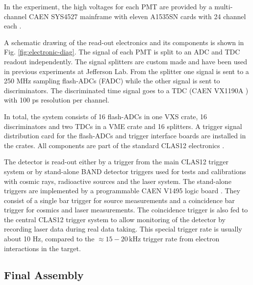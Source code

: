 \documentclass[3p,final,twocolumn]{elsarticle}
\begin{document}
In the experiment, the high voltages for each PMT are provided by a multi-channel CAEN SYS4527 mainframe with eleven A1535SN cards with 24 channel each \cite{caen-hvframe,caen-hvcard}.

A schematic drawing of the read-out electronics and its components is
shown in Fig. \ref{fig:electronic-diag}. The signal of each PMT is
split to an ADC and TDC readout independently.  The signal splitters
are custom made and have been used in previous experiments at
Jefferson Lab.  From the splitter one signal is sent to a 250
\si{\mega\hertz} sampling flash-ADCs \cite{fadc-manual} (FADC) while the
other signal is sent to discriminators.  The discriminated time signal
goes to a TDC (CAEN VX1190A \cite{caen-tdc}) with 100 ps resolution
per channel.


In total, the system consists of 16 flash-ADCs in one VXS crate, 16
discriminators and two TDCs in a VME crate and 16 splitters.
A trigger signal distribution card for the flash-ADCs and
trigger interface boards are installed in the crates. All components
are part of the standard CLAS12 electronics \cite{clas12-daq, clas12-trigger}.

The detector is read-out either by a trigger from the main CLAS12
trigger system \cite{clas12-trigger} or by stand-alone BAND detector
triggers used for tests and calibrations with cosmic rays, radioactive
sources and the laser system. The stand-alone triggers are implemented
by a programmable CAEN V1495 logic board \cite{caen-logicboard}. They
consist of a single bar trigger for source measurements and a
coincidence bar trigger for cosmics and laser measurements. The
coincidence trigger is also fed to the central CLAS12 trigger system
to allow monitoring of the detector by recording laser data during
real data taking. This special trigger rate is usually about 10
\si{\hertz}, compared to the $\approx 15-20\,\si{\kilo\hertz}$ trigger
rate from electron interactions in the target.




\subsection{Final Assembly}
\label{sec:assembly}
\end{document}
